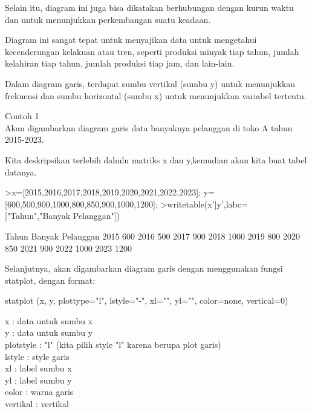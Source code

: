 \documentclass{article}
\begin{document}
\begin{eulernotebook}
\begin{eulercomment}
\begin{eulercomment}
\begin{eulercomment}
Selain itu, diagram ini juga bisa dikatakan berhubungan dengan kurun
waktu dan untuk menunjukkan perkembangan suatu keadaan.

Diagram ini sangat tepat untuk menyajikan data untuk mengetahui
kecenderungan kelakuan atau tren, seperti produksi minyak tiap tahun,
jumlah kelahiran tiap tahun, jumlah produksi tiap jam, dan lain-lain.

Dalam diagram garis, terdapat sumbu vertikal (sumbu y) untuk
menunjukkan frekuensi dan sumbu horizontal (sumbu x) untuk menunjukkan
variabel tertentu.

\end{eulercomment}
\begin{eulercomment}
Contoh 1\\
Akan digambarkan diagram garis data banyaknya pelanggan di toko A
tahun 2015-2023.

Kita deskripsikan terlebih dahulu matriks x dan y,kemudian akan kita
buat tabel datanya.
\end{eulercomment}
\begin{eulerprompt}
>x=[2015,2016,2017,2018,2019,2020,2021,2022,2023]; y=[600,500,900,1000,800,850,900,1000,1200];
>writetable(x'|y',labc=["Tahun","Banyak Pelanggan"])
\end{eulerprompt}
\begin{euleroutput}
       Tahun Banyak Pelanggan
        2015              600
        2016              500
        2017              900
        2018             1000
        2019              800
        2020              850
        2021              900
        2022             1000
        2023             1200
\end{euleroutput}
\begin{eulercomment}
Selanjutnya, akan digambarkan diagram garis dengan menggunakan fungsi
statplot, dengan format:

statplot (x, y, plottype="l", lstyle="-", xl="", yl="", color=none,
vertical=0)

x : data untuk sumbu x\\
y : data untuk sumbu y\\
plotstyle : "l" (kita pilih style "l" karena berupa plot garis)\\
lstyle : style garis\\
xl : label sumbu x\\
yl : label sumbu y\\
color : warna garis\\
vertikal : vertikal


\end{eulercomment}
\end{eulercomment}
\end{eulercomment}
\end{eulernotebook}
\end{document}
